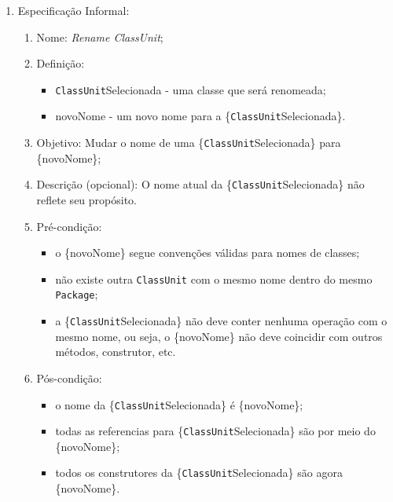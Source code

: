 \begin{enumerate}
	\item Especificação Informal:
		\begin{enumerate}
			\item Nome: \textit{Rename ClassUnit};
			\item Definição:
			    \begin{itemize}
			        \item \texttt{ClassUnit}Selecionada - uma classe que será renomeada;
			        \item novoNome - um novo nome para a \{\texttt{ClassUnit}Selecionada\}.
			    \end{itemize}
			\item Objetivo: Mudar o nome de uma \{\texttt{ClassUnit}Selecionada\} para \{novoNome\};
			\item Descrição (opcional): O nome atual da \{\texttt{ClassUnit}Selecionada\} não reflete seu propósito.
			\item Pré-condição:
			    \begin{itemize}
			        \item o \{novoNome\} segue convenções válidas para nomes de classes;
			        \item não existe outra \texttt{ClassUnit} com o mesmo nome dentro do mesmo \texttt{Package};
			        \item a \{\texttt{ClassUnit}Selecionada\} não deve conter nenhuma operação com o mesmo nome, ou seja, o \{novoNome\} não deve coincidir com outros métodos, construtor, etc. 
			    \end{itemize}
			\item Pós-condição:
			    \begin{itemize}
			        \item o nome da \{\texttt{ClassUnit}Selecionada\} é \{novoNome\};
			        \item todas as referencias para \{\texttt{ClassUnit}Selecionada\} são por meio do \{novoNome\};
			        \item todos os construtores da \{\texttt{ClassUnit}Selecionada\} são agora \{novoNome\}.

\end{itemize}
\end{enumerate}
\end{enumerate}
